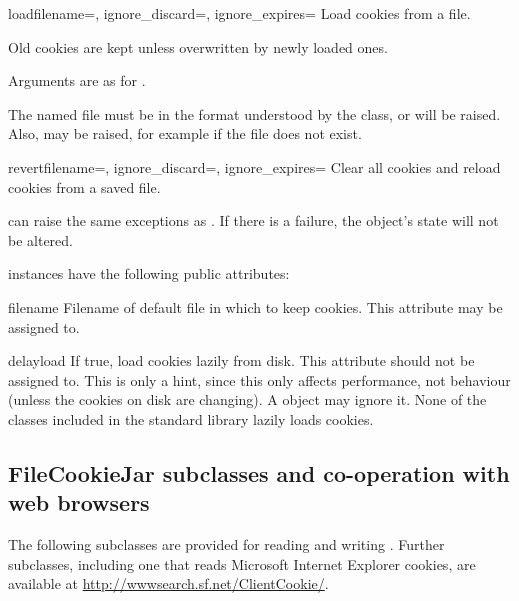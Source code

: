 \begin{methoddesc}[FileCookieJar]{load}{filename=,
    ignore_discard=, ignore_expires=}
Load cookies from a file.

Old cookies are kept unless overwritten by newly loaded ones.

Arguments are as for .

The named file must be in the format understood by the class, or
 will be raised.  Also,  may
be raised, for example if the file does not exist.  
\end{methoddesc}

\begin{methoddesc}[FileCookieJar]{revert}{filename=,
    ignore_discard=, ignore_expires=}
Clear all cookies and reload cookies from a saved file.

 can raise the same exceptions as .
If there is a failure, the object's state will not be altered.
\end{methoddesc}

 instances have the following public attributes:

\begin{memberdesc}[FileCookieJar]{filename}
Filename of default file in which to keep cookies.  This attribute may
be assigned to.
\end{memberdesc}

\begin{memberdesc}[FileCookieJar]{delayload}
If true, load cookies lazily from disk.  This attribute should not be
assigned to.  This is only a hint, since this only affects
performance, not behaviour (unless the cookies on disk are changing).
A  object may ignore it.  None of the
 classes included in the standard library lazily
loads cookies.
\end{memberdesc}


\subsection{FileCookieJar subclasses and co-operation with web browsers
  \label{file-cookie-jar-classes}}

The following  subclasses are provided for reading
and writing .  Further  subclasses, including one
that reads Microsoft Internet Explorer cookies, are available at
\url{http://wwwsearch.sf.net/ClientCookie/}.

